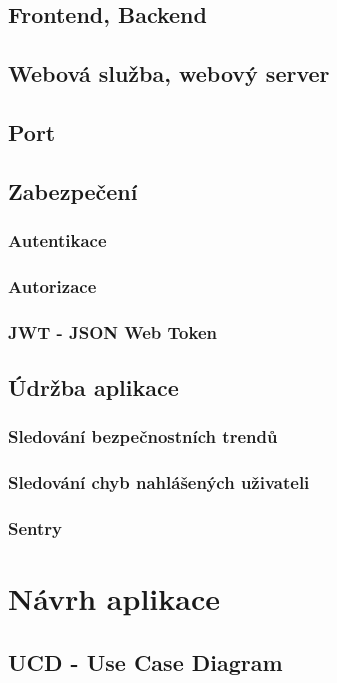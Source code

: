 \documentclass[14pt,a4paper]{article}
\begin{document}
        \subsection{Frontend, Backend}
        \subsection{Webová služba, webový server}
        \subsection{Port}
        \subsection{Zabezpečení}
            \subsubsection{Autentikace}
            \subsubsection{Autorizace}
            \subsubsection{JWT - JSON Web Token}
        \subsection{Údržba aplikace}
            \subsubsection{Sledování bezpečnostních trendů}
            \subsubsection{Sledování chyb nahlášených uživateli}
            \subsubsection{Sentry}
	
	\section{Návrh aplikace}
        \subsection{UCD - Use Case Diagram}
\end{document}
